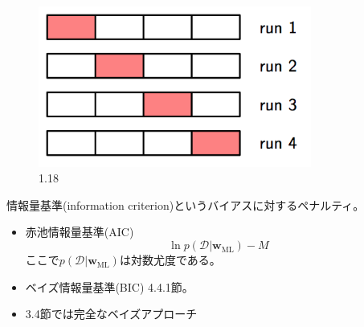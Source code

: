 \documentclass{jsarticle}
\def\w{{\bm{w}}}
\def\D{{\mathcal{D}}}
\begin{document}
\begin{figure}
  \centering
  \includegraphics[width=0.8\textwidth]{f1-18.png}
  \caption{1.18}
\end{figure}

情報量基準(information criterion)というバイアスに対するペナルティ。
\begin{itemize}
\item 赤池情報量基準(AIC)
  \[
  \ln p(\D | \w_{\mbox{ML}})-M
  \]
  ここで$p(\D | \w_{\mbox{ML}})$は対数尤度である。
\item ベイズ情報量基準(BIC) 4.4.1節。
\item 3.4節では完全なベイズアプローチ
\end{itemize}
\end{document}
